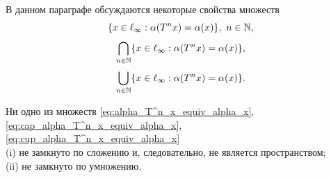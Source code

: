 В данном параграфе обсуждаются некоторые свойства множеств
\begin{equation}
	\label{eq:alpha_T^n_x_equiv_alpha_x}
	\{x \in \ell_\infty : \alpha(T^n x) = \alpha(x) \}, ~n\in\mathbb{N},
\end{equation}
\begin{equation}
	\label{eq:cap_alpha_T^n_x_equiv_alpha_x}
	\bigcap\limits_{n\in\mathbb{N}}\{x \in \ell_\infty : \alpha(T^n x) = \alpha(x) \}
	,
\end{equation}
\begin{equation}
	\label{eq:cup_alpha_T^n_x_equiv_alpha_x}
	\bigcup_{n\in\mathbb{N}}\{x \in \ell_\infty : \alpha(T^n x) = \alpha(x) \}
	.
\end{equation}

\begin{proposition}
	Ни одно из множеств
	\eqref{eq:alpha_T^n_x_equiv_alpha_x}, \eqref{eq:cap_alpha_T^n_x_equiv_alpha_x}, \eqref{eq:cup_alpha_T^n_x_equiv_alpha_x}
	\\
	(i)
	не замкнуто по сложению и, следовательно, не является пространством;
	\\
	(ii)
	не замкнуто по умножению.
\end{proposition}

